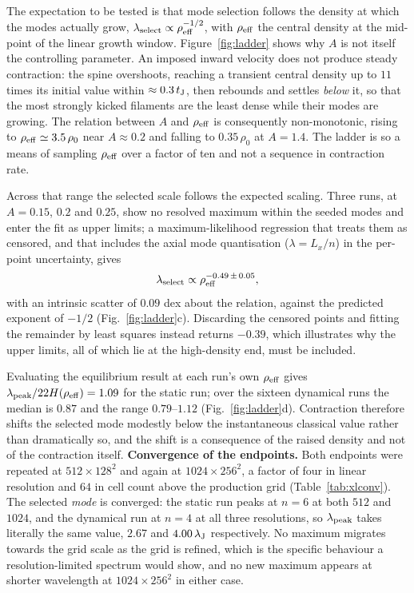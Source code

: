 \documentclass[usenatbib,twoside,twocolumn]{mnras}
\begin{document}
The expectation to be tested is that mode selection follows the density at which the modes actually grow, $\lambda_{\rm select}\propto\rho_{\rm eff}^{-1/2}$, with $\rho_{\rm eff}$ the central density at the mid-point of the linear growth window. Figure~\ref{fig:ladder} shows why $A$ is not itself the controlling parameter. An imposed inward velocity does not produce steady contraction: the spine overshoots, reaching a transient central density up to $11$ times its initial value within $\approx0.3\,t_{\rm J}$, then rebounds and settles \emph{below} it, so that the most strongly kicked filaments are the least dense while their modes are growing. The relation between $A$ and $\rho_{\rm eff}$ is consequently non-monotonic, rising to $\rho_{\rm eff}\simeq3.5\,\rho_0$ near $A\approx0.2$ and falling to $0.35\,\rho_0$ at $A=1.4$. The ladder is so a means of sampling $\rho_{\rm eff}$ over a factor of ten and not a sequence in contraction rate.

Across that range the selected scale follows the expected scaling. Three runs, at $A=0.15$, $0.2$ and $0.25$, show no resolved maximum within the seeded modes and enter the fit as upper limits; a maximum-likelihood regression that treats them as censored, and that includes the axial mode quantisation ($\lambda=L_x/n$) in the per-point uncertainty, gives
\begin{equation}
\lambda_{\rm select}\propto\rho_{\rm eff}^{-0.49\,\pm\,0.05},
\label{eq:ladderfit}
\end{equation}
with an intrinsic scatter of $0.09$ dex about the relation, against the predicted exponent of $-1/2$ (Fig.~\ref{fig:ladder}c). Discarding the censored points and fitting the remainder by least squares instead returns $-0.39$, which illustrates why the upper limits, all of which lie at the high-density end, must be included.

Evaluating the equilibrium result at each run's own $\rho_{\rm eff}$ gives $\lambda_{\rm peak}/22H(\rho_{\rm eff})=1.09$ for the static run; over the sixteen dynamical runs the median is $0.87$ and the range $0.79$--$1.12$ (Fig.~\ref{fig:ladder}d). Contraction therefore shifts the selected mode modestly below the instantaneous classical value rather than dramatically so, and the shift is a consequence of the raised density  and not of the contraction itself. \smallskip\noindent\textbf{Convergence of the endpoints.} Both endpoints were repeated at $512\times128^2$ and again at $1024\times256^2$, a factor of four in linear resolution and $64$ in cell count above the production grid (Table~\ref{tab:xlconv}). The selected \emph{mode} is converged: the static run peaks at $n=6$ at both $512$ and $1024$, and the dynamical run at $n=4$ at all three resolutions, so $\lambda_{\rm peak}$ takes literally the same value, $2.67$ and $4.00\,\lambda_{\rm J}$ respectively. No maximum migrates towards the grid scale as the grid is refined, which is the specific behaviour a resolution-limited spectrum would show, and no new maximum appears at shorter wavelength at $1024\times256^2$ in either case.
\end{document}
